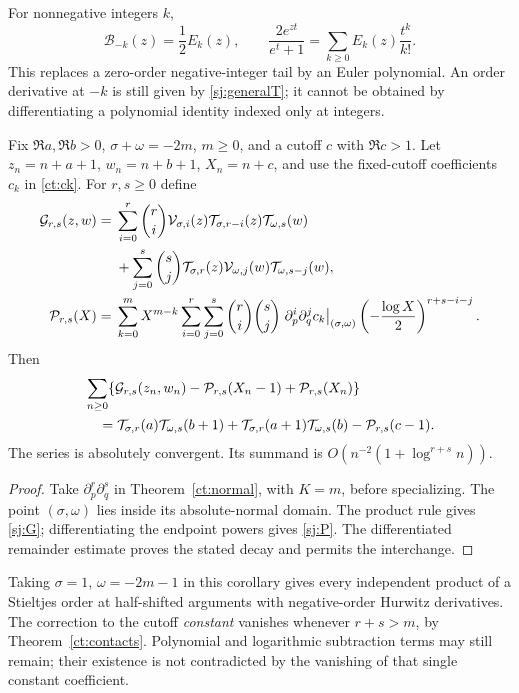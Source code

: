 For nonnegative integers \(k\),
\[
 \mathcal B_{-k}(z)=\frac12E_k(z),
 \qquad
 \frac{2e^{zt}}{e^t+1}=\sum_{k\ge0}E_k(z)\frac{t^k}{k!}.
\]
This replaces a zero-order negative-integer tail by an Euler polynomial.
An order derivative at \(-k\) is still given by
\eqref{sj:generalT}; it cannot be obtained by differentiating a polynomial
identity indexed only at integers.

\begin{corollary}
\label{sj:allboundary}
Fix \(\Re a,\Re b>0\), \(\sigma+\omega=-2m\), \(m\ge0\), and a cutoff \(c\) with
\(\Re c>1\). Let \(z_n=n+a+1\), \(w_n=n+b+1\), \(X_n=n+c\),
and use the fixed-cutoff coefficients \(c_k\) in \eqref{ct:ck}.
For \(r,s\ge0\) define
\begin{align}
 \mathcal G_{r,s}(z,w)
 ={}&\sum_{i=0}^r\binom ri
    \mathcal V_{\sigma,i}(z)
    \mathcal T_{\sigma,r-i}(z)\mathcal T_{\omega,s}(w)\notag\\
 &+\sum_{j=0}^s\binom sj
    \mathcal T_{\sigma,r}(z)\mathcal V_{\omega,j}(w)
    \mathcal T_{\omega,s-j}(w),\label{sj:G}\\
 \mathcal P_{r,s}(X)
 ={}&\sum_{k=0}^m X^{m-k}
   \sum_{i=0}^r\sum_{j=0}^s
       \binom ri\binom sj
       \left.\partial_p^i\partial_q^jc_k\right|_{(\sigma,\omega)}
       \left(-\frac{\log X}{2}\right)^{r+s-i-j}.
       \label{sj:P}
\end{align}
Then
\begin{align}
 &\sum_{n\ge0}
   \{\mathcal G_{r,s}(z_n,w_n)
          -\mathcal P_{r,s}(X_n-1)+\mathcal P_{r,s}(X_n)\}
       \notag\\
 &\quad=
 \mathcal T_{\sigma,r}(a)\mathcal T_{\omega,s}(b+1)
 +\mathcal T_{\sigma,r}(a+1)\mathcal T_{\omega,s}(b)
 -\mathcal P_{r,s}(c-1).
 \label{sj:ordinary}
\end{align}
The series is absolutely convergent. Its summand is
\(O(n^{-2}(1+\log^{r+s}n))\).
\end{corollary}

\begin{proof}
Take \(\partial_p^r\partial_q^s\) in
Theorem~\ref{ct:normal}, with \(K=m\), before specializing.
The point \((\sigma,\omega)\) lies inside its absolute-normal domain.
The product rule gives \eqref{sj:G}; differentiating the endpoint powers
gives \eqref{sj:P}. The differentiated remainder estimate proves the stated
decay and permits the interchange.
\end{proof}

Taking \(\sigma=1\), \(\omega=-2m-1\) in this corollary gives every
independent product of a Stieltjes order at half-shifted arguments with
negative-order Hurwitz derivatives. The correction to the cutoff
\emph{constant} vanishes whenever \(r+s>m\), by
Theorem~\ref{ct:contacts}. Polynomial and logarithmic subtraction terms may
still remain; their existence is not contradicted by the vanishing of that
single constant coefficient.

